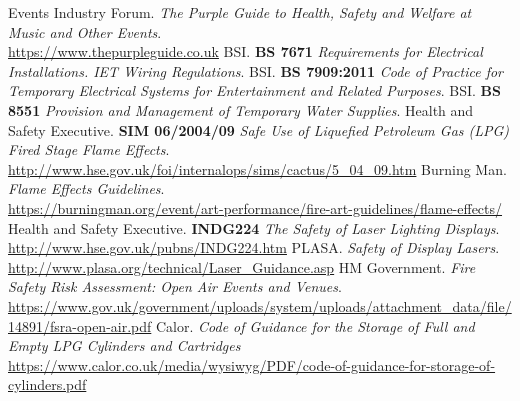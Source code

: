 \addtocounter{subsection}{1}

\restoregeometry
\newpage
\begin{thebibliography}{18}
    Events Industry Forum.
    \textit{The Purple Guide to Health, Safety and Welfare at Music and Other Events}. \\
    \href{https://www.thepurpleguide.co.uk}{https://www.thepurpleguide.co.uk}
    BSI.
    \textbf{BS 7671} \textit{Requirements for Electrical Installations. IET Wiring Regulations}.
    BSI.
    \textbf{BS 7909:2011} \textit{Code of Practice for Temporary Electrical Systems for Entertainment and Related Purposes}.
    BSI.
    \textbf{BS 8551} \textit{Provision and Management of Temporary Water Supplies}.
    Health and Safety Executive.
    \textbf{SIM 06/2004/09} \textit{Safe Use of Liquefied Petroleum Gas (LPG) Fired Stage Flame Effects}. \\
    \href{http://www.hse.gov.uk/foi/internalops/sims/cactus/5\_04\_09.htm}{http://www.hse.gov.uk/foi/internalops/sims/cactus/5\_04\_09.htm}
    Burning Man.
    \textit{Flame Effects Guidelines}. \\
    \href{https://burningman.org/event/art-performance/fire-art-guidelines/flame-effects/}{https://burningman.org/event/art-performance/fire-art-guidelines/flame-effects/}
    Health and Safety Executive.
    \textbf{INDG224} \textit{The Safety of Laser Lighting Displays}. \\
        \href{http://www.hse.gov.uk/pubns/INDG224.htm}{http://www.hse.gov.uk/pubns/INDG224.htm}
    PLASA.
    \textit{Safety of Display Lasers}. \\
    \href{http://www.plasa.org/technical/Laser\_Guidance.asp}{http://www.plasa.org/technical/Laser\_Guidance.asp}
    HM Government.
    \textit{Fire Safety Risk Assessment: Open Air Events and Venues}. \\
    \href{https://www.gov.uk/government/uploads/system/uploads/attachment\_data/file/14891/fsra-open-air.pdf}{https://www.gov.uk/government/uploads/system/uploads/attachment\_data/file/14891/fsra-open-air.pdf}
    Calor.
    \textit{Code of Guidance for the Storage of Full and Empty LPG Cylinders and Cartridges}
    \href{https://www.calor.co.uk/media/wysiwyg/PDF/code-of-guidance-for-storage-of-cylinders.pdf}{https://www.calor.co.uk/media/wysiwyg/PDF/code-of-guidance-for-storage-of-cylinders.pdf}

\end{thebibliography}

